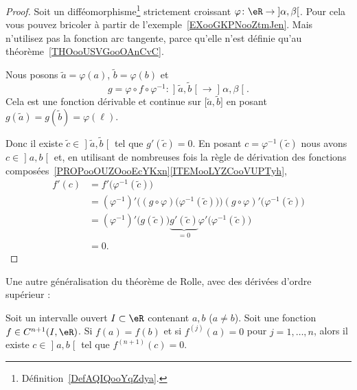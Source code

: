 \begin{proof}
	Soit un difféomorphisme\footnote{Définition~\ref{DefAQIQooYqZdya}.} strictement croissant \( \varphi\colon \eR\to \mathopen] \alpha , \beta \mathclose[\). Pour cela vous pouvez bricoler à partir de l'exemple~\ref{EXooGKPNooZtmJen}.
		Mais n'utilisez pas la fonction arc tangente, parce qu'elle n'est définie qu'au théorème~\ref{THOooUSVGooOAnCvC}.

		Nous posons \( \tilde a=\varphi(a)\), \( \tilde b=\varphi(b)\) et
		\begin{equation}
			g= \varphi\circ f\circ \varphi^{-1}\colon \mathopen] \tilde  a , \tilde b \mathclose[\to \mathopen] \alpha , \beta \mathclose[.
		\end{equation}
		Cela est une fonction dérivable et continue sur \( \mathopen[ \tilde a , \tilde  b \mathclose]\) en posant \( g(\tilde a)=g(\tilde b)=\varphi(\ell)\).

		Donc il existe \( \tilde c\in\mathopen] \tilde a , \tilde b \mathclose[\) tel que \( g'(\tilde c)=0\). En posant \( c=\varphi^{-1}(\tilde c)\) nous avons \( c\in \mathopen] a , b \mathclose[\) et, en utilisant de nombreuses fois la règle de dérivation des fonctions composées~\ref{PROPooOUZOooEcYKxn}\ref{ITEMooLYZCooVUPTyh},
	\begin{subequations}
		\begin{align}
			f'(c) & =f'\big( \varphi^{-1}(\tilde c) \big)                                                                                            \\
			      & =(\varphi^{-1})'\Big( (g\circ \varphi)\big( \varphi^{-1}(\tilde c) \big) \Big)(g\circ\varphi)'\big( \varphi^{-1}(\tilde c) \big) \\
			      & =(\varphi^{-1})'\big( g(\tilde c) \big)\underbrace{g'(\tilde c)}_{=0}\varphi'\big( \varphi^{-1}(\tilde c) \big)                  \\
			      & =0.
		\end{align}
	\end{subequations}
\end{proof}

Une autre généralisation du théorème de Rolle, avec des dérivées d'ordre supérieur :
\begin{proposition}      \label{PROPooCPCAooJjOZNy}
	Soit un intervalle ouvert \( I\subset \eR\) contenant \( a,b\) (\( a\neq b\)). Soit une fonction \( f\in C^{n+1}(I,\eR)\). Si \( f(a)=f(b)\) et si \( f^{(j)}(a)=0\) pour \( j=1,\ldots, n\), alors il existe \( c\in \mathopen] a , b \mathclose[\) tel que \( f^{(n+1)}(c)=0\).
\end{proposition}

